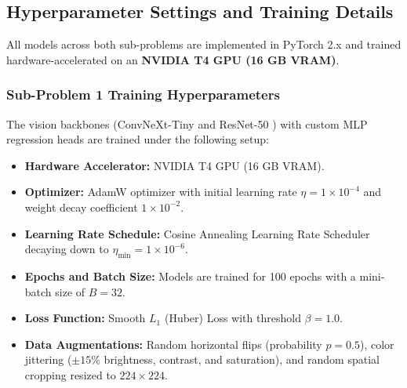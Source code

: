 \subsection{Hyperparameter Settings and Training Details}

All models across both sub-problems are implemented in PyTorch 2.x and trained hardware-accelerated on an \textbf{NVIDIA T4 GPU (16 GB VRAM)}.

\subsubsection{Sub-Problem 1 Training Hyperparameters}
The vision backbones (ConvNeXt-Tiny \cite{convnext} and ResNet-50 \cite{resnet}) with custom MLP regression heads are trained under the following setup:
\begin{itemize}
    \item \textbf{Hardware Accelerator:} NVIDIA T4 GPU (16 GB VRAM).
    \item \textbf{Optimizer:} AdamW optimizer with initial learning rate $\eta = 1 \times 10^{-4}$ and weight decay coefficient $1 \times 10^{-2}$.
    \item \textbf{Learning Rate Schedule:} Cosine Annealing Learning Rate Scheduler decaying down to $\eta_{\min} = 1 \times 10^{-6}$.
    \item \textbf{Epochs and Batch Size:} Models are trained for 100 epochs with a mini-batch size of $B = 32$.
    \item \textbf{Loss Function:} Smooth $L_1$ (Huber) Loss \cite{huber} with threshold $\beta = 1.0$.
    \item \textbf{Data Augmentations:} Random horizontal flips (probability $p=0.5$), color jittering ($\pm 15\%$ brightness, contrast, and saturation), and random spatial cropping resized to $224 \times 224$.
\end{itemize}

